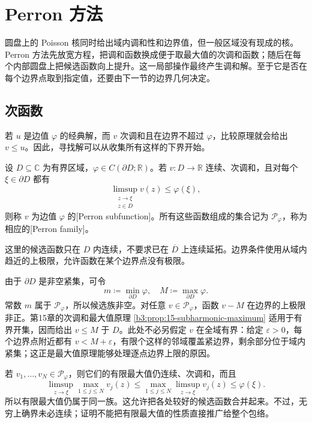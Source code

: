 \section{Perron 方法}
\label{b3:sec:1602}

圆盘上的 Poisson 核同时给出域内调和性和边界值，但一般区域没有现成的核。Perron 方法先放宽方程，把调和函数换成便于取最大值的次调和函数；随后在每个内部圆盘上把候选函数向上提升。这一局部操作最终产生调和解。至于它是否在每个边界点取到指定值，还要由下一节的边界几何决定。

\subsection{次函数}
\label{b3:subsec:160201}

若 \(u\) 是边值 \(\varphi\) 的经典解，而 \(v\) 次调和且在边界不超过 \(\varphi\)，比较原理就会给出 \(v\le u\)。因此，寻找解可以从收集所有这样的下界开始。

\begin{definition}
设 \(D\subseteq\mathbb C\) 为有界区域，\(\varphi\in C(\partial D;\mathbb R)\)。若 \(v:D\to\mathbb R\) 连续、次调和，且对每个 \(\xi\in\partial D\) 都有
\[
 \limsup_{\substack{z\to\xi\\z\in D}}v(z)\le\varphi(\xi),
\]
则称 \(v\) 为边值 \(\varphi\) 的[Perron subfunction]。所有这些函数组成的集合记为 \(\mathcal P_\varphi\)，称为相应的[Perron family]。
\end{definition}

这里的候选函数只在 \(D\) 内连续，不要求已在 \(\overline D\) 上连续延拓。边界条件使用从域内趋近的上极限，允许函数在某个边界点没有极限。

\ProseParagraphBreak
由于 \(\partial D\) 是非空紧集，可令
\[
 m\coloneqq\min_{\partial D}\varphi,
 \quad M\coloneqq\max_{\partial D}\varphi.
\]
常数 \(m\) 属于 \(\mathcal P_\varphi\)，所以候选族非空。对任意 \(v\in\mathcal P_\varphi\)，函数 \(v-M\) 在边界的上极限非正。第15章的次调和最大值原理 \cref{b3:prop:15-subharmonic-maximum} 适用于有界开集，因而给出 \(v\le M\) 于 \(D\)。此处不必另假定 \(v\) 在全域有界：给定 \(\varepsilon>0\)，每个边界点附近都有 \(v<M+\varepsilon\)，有限个这样的邻域覆盖紧边界，剩余部分位于域内紧集；这正是最大值原理能够处理逐点边界上限的原因。

\ProseParagraphBreak
若 \(v_1,\ldots,v_N\in\mathcal P_\varphi\)，则它们的有限最大值仍连续、次调和，而且
\[
 \limsup_{z\to\xi}\max_{1\le j\le N}v_j(z)
 \le\max_{1\le j\le N}\limsup_{z\to\xi}v_j(z)
 \le\varphi(\xi).
\]
所以有限最大值仍属于同一族。这允许把各处较好的候选函数合并起来。不过，无穷上确界未必连续；证明不能把有限最大值的性质直接推广给整个包络。

